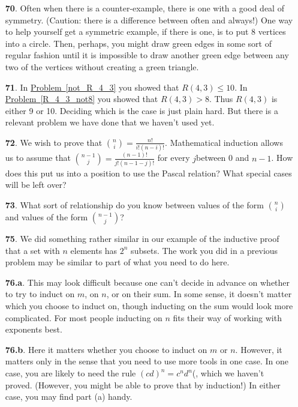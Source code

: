 \documentclass[10pt,]{book}
\theoremstyle{plain}
\theoremstyle{definition}
\theoremstyle{definition}
\numberwithin{equation}{chapter}
\newcommand{\gt}{>}
\begin{document}
\begin{itemize}[itemsep=1em]
\item[\textbf{70}.]Often when there is a counter-example, there is one with a good deal of symmetry. (Caution: there is a difference between often and always!) One way to help yourself get a symmetric example, if there is one, is to put 8 vertices into a circle. Then, perhaps, you might draw green edges in some sort of regular fashion until it is impossible to draw another green edge between any two of the vertices without creating a green triangle.%

\item[\textbf{71}.]In \hyperref[not_R_4_3]{Problem~\ref{not_R_4_3}} you showed that \(R(4, 3) \le 10\). In \hyperref[R_4_3_not8]{Problem~\ref{R_4_3_not8}} you showed that \(R(4, 3) \gt 8\). Thus \(R(4, 3)\) is either 9 or 10. Deciding which is the case is just plain hard. But there is a relevant problem we have done that we haven't used yet.%

\item[\textbf{72}.]We wish to prove that \(\binom{n}{i} =\frac{n!}{i!(n-i)!}\). Mathematical induction allows us to assume that \(\binom{n-1}{j}=\frac{(n-1)!}{j! (n-1-j)!}\) for every \(j\)between 0 and \(n-1\). How does this put us into a position to use the Pascal relation? What special cases will be left over?%

\item[\textbf{73}.]What sort of relationship do you know between values of the form \(\binom{n}{i}\) and values of the form \(\binom{n-1}{j}\)?%

\item[\textbf{75}.]We did something rather similar in our example of the inductive proof that a set with \(n\) elements has \(2^n\) subsets. The work you did in a previous problem may be similar to part of what you need to do here.%

\item[\textbf{76.a}.]This may look difficult because one can't decide in advance on whether to try to induct on \(m\), on \(n\), or on their sum. In some sense, it doesn't matter which you choose to induct on, though inducting on the sum would look more complicated. For most people inducting on \(n\) fits their way of working with exponents best.%

\item[\textbf{76.b}.]Here it matters whether you choose to induct on \(m\) or \(n\). However, it matters only in the sense that you need to use more tools in one case. In one case, you are likely to need the rule \((cd)^n=c^n d^n\)(, which we haven't proved. (However, you might be able to prove that by induction!) In either case, you may find part (a) handy.%


\end{itemize}
\end{document}
